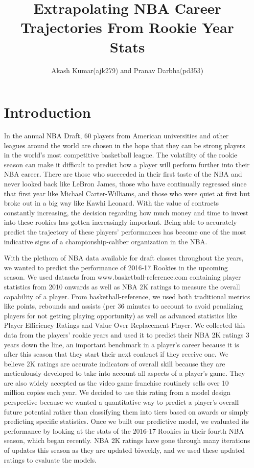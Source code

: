 \documentclass{article}
\title{Extrapolating NBA Career Trajectories From Rookie Year Stats}
\author{Akash Kumar(ajk279) and Pranav Darbha(pd353)}
\date{\vspace{-5ex}}
\begin{document}
\maketitle
\clearpage
\section{Introduction}
In the annual NBA Draft, 60 players from American universities and other leagues around the world are chosen in the hope that they can be strong players in the world's most competitive basketball league. The volatility of the rookie season can make it difficult to predict how a player will perform further into their NBA career. There are those who succeeded in their first taste of the NBA and never looked back like LeBron James, those who have continually regressed since that first year like Michael Carter-Williams, and those who were quiet at first but broke out in a big way like Kawhi Leonard. With the value of contracts constantly increasing, the decision regarding how much money and time to invest into these rookies has gotten increasingly important. Being able to accurately predict the trajectory of these players' performances has become one of the most indicative signs of a championship-caliber organization in the NBA.

With the plethora of NBA data available for draft classes throughout the years, we wanted to predict the performance of 2016-17 Rookies in the upcoming season. We used datasets from www.basketball-reference.com containing player statistics from 2010 onwards as well as NBA 2K ratings to measure the overall capability of a player. From basketball-reference, we used both traditional metrics like points, rebounds and assists (per 36 minutes to account to avoid penalizing players for not getting playing opportunity) as well as advanced statistics like Player Efficiency Ratings and Value Over Replacement Player. We collected this data from the players' rookie years and used it to predict their NBA 2K ratings 3 years down the line, an important benchmark in a player's career because it is after this season that they start their next contract if they receive one. We believe 2K ratings are accurate indicators of overall skill because they are meticulously developed to take into account all aspects of a player's game. They are also widely accepted as the video game franchise routinely sells over 10 million copies each year. We decided to use this rating from a model design perspective because we wanted a quantitative way to predict a player's overall future potential rather than classifying them into tiers based on awards or simply predicting specific statistics. Once we built our predictive model, we evaluated its performance by looking at the stats of the 2016-17 Rookies in their fourth NBA season, which began recently. NBA 2K ratings have gone through many iterations of updates this season as they are updated biweekly, and we used these updated ratings to evaluate the models.
\end{document}
